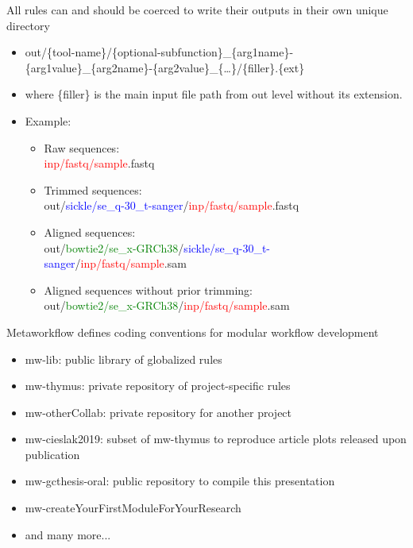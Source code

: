 \documentclass[10pt]{beamer}
\begin{document}
    \begin{frame}{All rules can and should be coerced to write their outputs in their own unique directory}
      \begin{itemize}
        \item out/\{tool-name\}/\{optional-subfunction\}\_\{arg1name\}-\{arg1value\}\_\{arg2name\}-\{arg2value\}\_\{\ldots\}/\{filler\}.\{ext\}
        \item where \{filler\} is the main input file path from out level without its extension.
        \item Example:
          \begin{itemize}
            \item Raw sequences:\\
              \textcolor{red}{inp/fastq/sample}.fastq
            \item Trimmed sequences:\\
              out/\textcolor{blue}{sickle/se\_q-30\_t-sanger}/\textcolor{red}{inp/fastq/sample}.fastq
            \item Aligned sequences:\\
              out/\textcolor{green}{bowtie2/se\_x-GRCh38}/\textcolor{blue}{sickle/se\_q-30\_t-sanger}/\textcolor{red}{inp/fastq/sample}.sam
            \item Aligned sequences without prior trimming:\\
              out/\textcolor{green}{bowtie2/se\_x-GRCh38}/\textcolor{red}{inp/fastq/sample}.sam
          \end{itemize}
      \end{itemize}
    \end{frame}
    \begin{frame}{Metaworkflow defines coding conventions for modular workflow development}
      \begin{itemize}
        \item mw-lib: public library of globalized rules
        \item mw-thymus: private repository of project-specific rules
        \item mw-otherCollab: private repository for another project
        \item mw-cieslak2019: subset of mw-thymus to reproduce article plots released upon publication
        \item mw-gcthesis-oral: public repository to compile this presentation
        \item mw-createYourFirstModuleForYourResearch
        \item and many more...
      \end{itemize}
    \end{frame}
\end{document}
